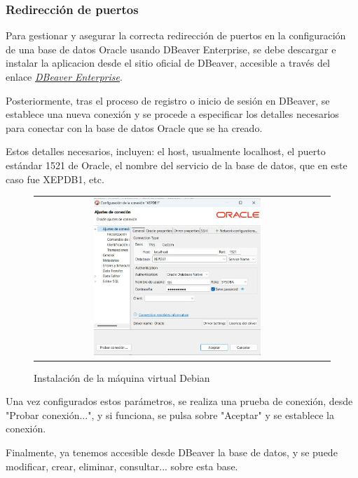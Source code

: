 \documentclass{article}
\begin{document}
\subsubsection{Redirección de puertos}

Para gestionar y asegurar la correcta redirección de puertos en la configuración de una base de datos Oracle usando DBeaver Enterprise, se debe descargar e instalar la aplicacion desde el sitio oficial de DBeaver, accesible a través del enlace \textit{\textcolor{blue}{\href{https://dbeaver.com/download/enterprise/}{DBeaver Enterprise}}}. 

Posteriormente, tras el proceso de registro o inicio de sesión en DBeaver, se establece una nueva conexión y se procede a especificar los detalles necesarios para conectar con la base de datos Oracle que se ha creado. 

Estos detalles necesarios, incluyen: el host, usualmente localhost, el puerto estándar 1521 de Oracle, el nombre del servicio de la base de datos, que en este caso fue XEPDB1, etc. 

\begin{figure}[H]
    \centering
    \begin{tabular}{c c}  %
    \includegraphics[width=0.6\textwidth]{configuracion_ajustes_conexion_oracle.png}
    \end{tabular}
    \caption{Instalación de la máquina virtual Debian}
    \label{fig:Configuración DBeaver de Oracle}
\end{figure}

Una vez configurados estos parámetros, se realiza una prueba de conexión, desde "Probar conexión...", y si funciona, se pulsa sobre "Aceptar" y se establece la conexión. 

Finalmente, ya tenemos accesible desde DBeaver la base de datos, y se puede modificar, crear, eliminar, consultar... sobre esta base. 
\end{document}
